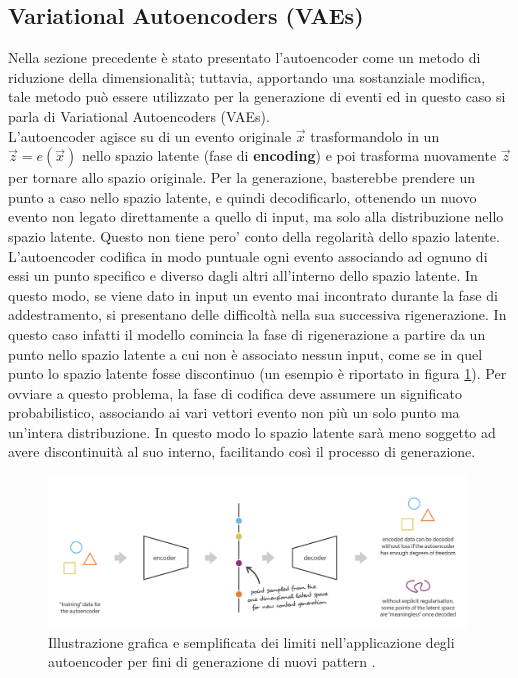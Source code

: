\subsection{Variational Autoencoders (VAEs)}
\label{VAEs}

Nella sezione precedente è stato presentato l'autoencoder come un metodo di riduzione della dimensionalità; tuttavia, apportando una sostanziale modifica, tale metodo può essere utilizzato per la generazione di eventi ed in questo caso si parla di Variational Autoencoders (VAEs). \\ 
L'autoencoder agisce su di un evento originale $\vec{x}$ trasformandolo in un $\vec{z} = e(\vec{x})$ nello spazio latente (fase di \textbf{encoding}) e poi trasforma nuovamente $\vec{z}$ per tornare allo spazio originale. Per la generazione, basterebbe prendere un punto a caso nello spazio latente, e quindi decodificarlo, ottenendo un nuovo evento non legato direttamente a quello di input, ma solo alla distribuzione nello spazio latente. Questo non tiene pero' conto della regolarità dello spazio latente.\\ 
L'autoencoder codifica in modo puntuale ogni evento associando ad ognuno di essi un punto specifico e diverso dagli altri all'interno dello spazio latente. In questo modo, se viene dato in input un evento mai incontrato durante la fase di addestramento, si presentano delle difficoltà nella sua successiva rigenerazione. In questo caso infatti il modello comincia la fase di rigenerazione a partire da un punto nello spazio latente a cui non è associato nessun input, come se in quel punto lo spazio latente fosse discontinuo (un esempio è riportato in figura \ref{limite autoencoder}). Per ovviare a questo problema, la fase di codifica deve assumere un significato probabilistico, associando ai vari vettori evento non più un solo punto ma un'intera distribuzione. In questo modo lo spazio latente sarà meno soggetto ad avere discontinuità al suo interno, facilitando così il processo di generazione.

\begin{figure}[h!]
	\centering
	\includegraphics[width=0.99\textwidth]{figs/limite_autoencoder.png}
	\caption{Illustrazione grafica e semplificata dei limiti nell'applicazione degli autoencoder per fini di generazione di nuovi pattern \cite{Understanding_VAEs}.}
	\label{limite autoencoder}
\end{figure}
 

